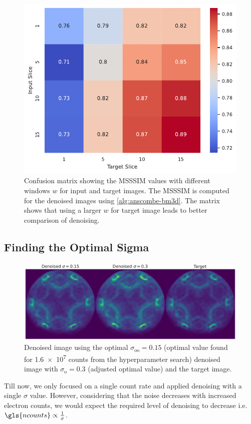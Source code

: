 \begin{figure}
    \centering
    \includegraphics[width=0.5\linewidth]{images/confusion_matrix_msssim_window_avg.pdf}
    \caption{Confusion matrix showing the \gls{MSSSIM} values with different windows $w$ for input and target images. The \gls{MSSSIM} is computed for the denoised images using \cref{alg:anscombe-bm3d}. The matrix shows that using a larger $w$ for target image leads to better comparison of denoising.}
    \label{fig:confusion_matrix_msssim_window_avg}
\end{figure}

\subsection{Finding the Optimal Sigma}
\begin{figure}
    \centering
    \includegraphics[width=1\linewidth]{images/denoised_optimal_sigma.pdf}
    \caption{Denoised image using the optimal $\sigma_{\text{oo}}=0.15$ (optimal value found for \num{1.6e7} counts from the hyperparameter search) denoised image with $\sigma_{\text{o}}=0.3$ (adjusted optimal value) and the target image.}
    \label{fig:denoised-optimal-sigma}
\end{figure}
Till now, we only focused on a single count rate and applied denoising with a single $\sigma$ value. However, considering that the noise decreases with increased electron counts, we would expect the required level of denoising to decrease i.e. $\gls{ncounts}\propto\frac{1}{\sigma}$.

